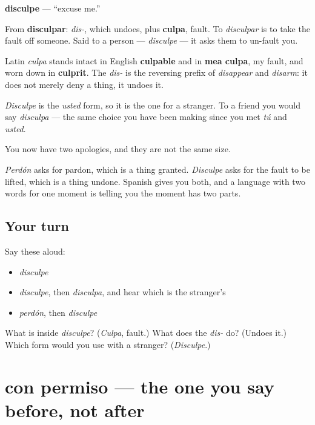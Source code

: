 \begin{cousinweb}
\textbf{disculpe} — \textquotedblleft{}excuse me.\textquotedblright{}

From \textbf{disculpar}: \emph{dis-}, which undoes, plus \textbf{culpa}, fault. To \emph{disculpar} is to take the fault off someone. Said to a person — \emph{disculpe} — it asks them to un-fault you.

Latin \emph{culpa} stands intact in English \textbf{culpable} and in \textbf{mea culpa}, my fault, and worn down in \textbf{culprit}. The \emph{dis-} is the reversing prefix of \emph{disappear} and \emph{disarm}: it does not merely deny a thing, it undoes it.

\emph{Disculpe} is the \emph{usted} form, so it is the one for a stranger. To a friend you would say \emph{disculpa} — the same choice you have been making since you met \emph{tú} and \emph{usted}.
\end{cousinweb}

\begin{grammarlens}[title={What you've built}]
You now have two apologies, and they are not the same size.

\emph{Perdón} asks for pardon, which is a thing granted. \emph{Disculpe} asks for the fault to be lifted, which is a thing undone. Spanish gives you both, and a language with two words for one moment is telling you the moment has two parts.
\end{grammarlens}

\subsection*{Your turn}
Say these aloud:

\begin{itemize}
\raggedright
  \item \emph{disculpe}
  \item \emph{disculpe}, then \emph{disculpa}, and hear which is the stranger's
  \item \emph{perdón}, then \emph{disculpe}
\end{itemize}

\begin{tcolorbox}[breakable,colback=teal!4,colframe=teal!35!black,title={Before you move on}]
What is inside \emph{disculpe}? (\emph{Culpa}, fault.) What does the \emph{dis-} do? (Undoes it.) Which form would you use with a stranger? (\emph{Disculpe}.)
\end{tcolorbox}
\section[con permiso]{con permiso — the one you say before, not after}


